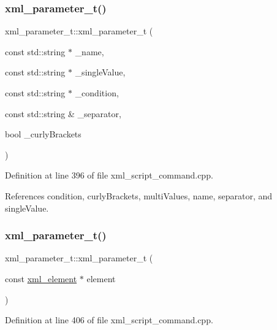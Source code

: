 \subsubsection{\texorpdfstring{xml\+\_\+parameter\+\_\+t()}{xml\_parameter\_t()}\hspace{0.1cm}{\footnotesize\ttfamily [1/2]}}
{\footnotesize\ttfamily xml\+\_\+parameter\+\_\+t\+::xml\+\_\+parameter\+\_\+t (\begin{DoxyParamCaption}\item[{const std\+::string $\ast$}]{\+\_\+name,  }\item[{const std\+::string $\ast$}]{\+\_\+single\+Value,  }\item[{const std\+::string $\ast$}]{\+\_\+condition,  }\item[{const std\+::string \&}]{\+\_\+separator,  }\item[{bool}]{\+\_\+curly\+Brackets }\end{DoxyParamCaption})}



Definition at line 396 of file xml\+\_\+script\+\_\+command.\+cpp.



References condition, curly\+Brackets, multi\+Values, name, separator, and single\+Value.

\mbox{\label{classxml__parameter__t_a7ba134d6d789710c6cccb959c955341f}} 
\subsubsection{\texorpdfstring{xml\+\_\+parameter\+\_\+t()}{xml\_parameter\_t()}\hspace{0.1cm}{\footnotesize\ttfamily [2/2]}}
{\footnotesize\ttfamily xml\+\_\+parameter\+\_\+t\+::xml\+\_\+parameter\+\_\+t (\begin{DoxyParamCaption}\item[{const \hyperlink{classxml__element}{xml\+\_\+element} $\ast$}]{element }\end{DoxyParamCaption})\hspace{0.3cm}{\ttfamily [explicit]}}



Definition at line 406 of file xml\+\_\+script\+\_\+command.\+cpp.



